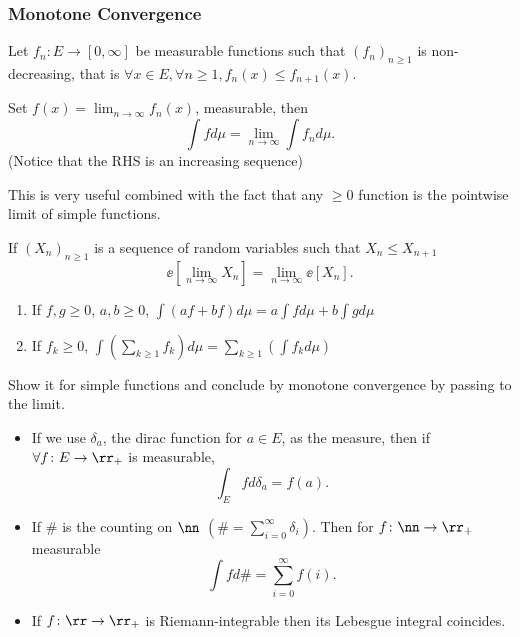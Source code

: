 \documentclass[../main.tex]{subfiles}
\begin{document}
\subsubsection{Monotone Convergence}
\begin{theorem}
  Let $f_n \colon E \to [0, \infty]$ be measurable functions such that
  $(f_n)_{n \geq 1}$ is non-decreasing, that is $\forall x \in E,
  \forall n \geq 1, f_n(x) \leq f_{n+1}(x)$.

  \vspace{0.2em}
  \noindent
  Set $f(x) = \lim_{n \to \infty} f_n(x)$, measurable, then
  \[
  \int f d\mu = \lim_{n \to \infty} \int f_n d\mu
  .\] 
  (Notice that the RHS is an increasing sequence)
\end{theorem}  

This is very useful combined with the fact that any $\geq 0$ function
is the pointwise limit of simple functions.

\begin{theorem}
  If $(X_n)_{n \geq 1}$ is a sequence of random variables such that
  $X_n \leq X_{n + 1}$ 
  \[
    \ee [\lim_{n \to \infty} X_n] = \lim_{n \to \infty} \ee[X_n]
  .\] 
\end{theorem}

\begin{corollary}
    \hfill

    \begin{enumerate}
      \item If $f, g \geq 0$, $a, b \geq 0$, $\int (af + bf)d\mu  =
        a\int f d\mu + b \int g d\mu$
      \item If $f_k \geq 0$, $\int(\sum_{k \geq 1} f_k) d\mu = \sum_{k
        \geq 1} (\int f_k d\mu) $
    \end{enumerate}
\end{corollary}
\begin{sketch}
    Show it for simple functions and conclude by monotone convergence
    by passing to the limit.
\end{sketch}

\begin{example}
    \hfill

    \begin{itemize}
      \item If we use $\delta_a$, the dirac function for $a \in E$, as the measure,
        then if $\forall f \colon E \to \rr_+$ is measurable, 
        \[
          \int_E f d\delta_a = f(a)
        .\] 
    \item If $\#$ is the counting on $\nn$ $(\# = \sum_{i = 0}^\infty
      \delta_i)$. Then for $f \colon \nn \to \rr_+$ measurable
        \[
          \int f d\# = \sum_{i = 0}^\infty f(i)
        .\] 
    \item If $f \colon \rr \to \rr_+$ is Riemann-integrable then its
      Lebesgue integral coincides.
    \end{itemize}
\end{example}
\end{document}
